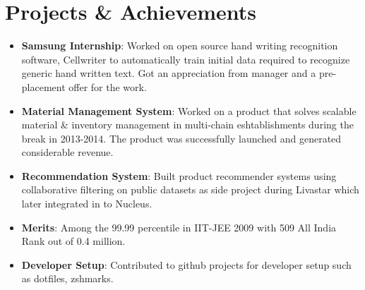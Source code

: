 \documentclass[letterpaper,11pt]{article}
\newcommand{\resumeItem}[2]{
  \item\small{
    \textbf{#1}{: #2 \vspace{-2pt}}
  }
}
\newcommand{\resumeSubItem}[2]{\resumeItem{#1}{#2}\vspace{-4pt}}
\newcommand{\resumeSubHeadingListStart}{\begin{itemize}[leftmargin=*]}
\newcommand{\resumeSubHeadingListEnd}{\end{itemize}}
\begin{document}
\section{Projects \& Achievements}
  \resumeSubHeadingListStart
    \resumeSubItem{Samsung Internship}
      {Worked on open source hand writing recognition software, Cellwriter to automatically train initial data required to recognize generic hand written text. Got an appreciation from manager and a pre-placement offer for the work.}
    \resumeSubItem{Material Management System}
      {Worked on a product that solves scalable material \& inventory management in multi-chain eshtablishments during the break in 2013-2014. The product was successfully launched and generated considerable revenue.}
    \resumeSubItem{Recommendation System}
      {Built product recommender systems using collaborative filtering on public datasets as side project during Livastar which later integrated in to Nucleus.}
    \resumeSubItem{Merits}
      {Among the 99.99 percentile in IIT-JEE 2009 with 509 All India Rank out of 0.4 million.}
    \resumeSubItem{Developer Setup}
      {Contributed to github projects for developer setup such as dotfiles, zshmarks.}
  \resumeSubHeadingListEnd

%


\end{document}

